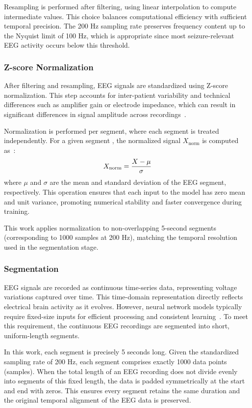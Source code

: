 Resampling is performed after filtering, using linear interpolation to compute intermediate values. This choice balances computational efficiency with sufficient temporal precision. The 200 Hz sampling rate preserves frequency content up to the Nyquist limit of 100 Hz, which is appropriate since most seizure-relevant EEG activity occurs below this threshold.

\subsubsection{Z-score Normalization}
After filtering and resampling, EEG signals are standardized using Z-score normalization. This step accounts for inter-patient variability and technical differences such as amplifier gain or electrode impedance, which can result in significant differences in signal amplitude across recordings~\cite{zscore}.

Normalization is performed per segment, where each segment is treated independently. For a given segment , the normalized signal $X_{\text{norm}}$ is computed as~\cite{zscore}:
\begin{equation}
\centering
X_{\text{norm}} = \frac{X - \mu}{\sigma}
\label{eq:normalization}
\end{equation}
where $\mu$ and $\sigma$ are the mean and standard deviation of the EEG segment, respectively. This operation ensures that each input to the model has zero mean and unit variance, promoting numerical stability and faster convergence during training.

This work applies normalization to non-overlapping 5-second segments (corresponding to 1000 samples at 200 Hz), matching the temporal resolution used in the segmentation stage.

\subsubsection{Segmentation}
EEG signals are recorded as continuous time-series data, representing voltage variations captured over time. This time-domain representation directly reflects electrical brain activity as it evolves. However, neural network models typically require fixed-size inputs for efficient processing and consistent learning~\cite{eegsignal}. To meet this requirement, the continuous EEG recordings are segmented into short, uniform-length segments.

In this work, each segment is precisely 5 seconds long. Given the standardized sampling rate of 200 Hz, each segment comprises exactly 1000 data points (samples). When the total length of an EEG recording does not divide evenly into segments of this fixed length, the data is padded symmetrically at the start and end with zeros. This ensures every segment retains the same duration and the original temporal alignment of the EEG data is preserved.

